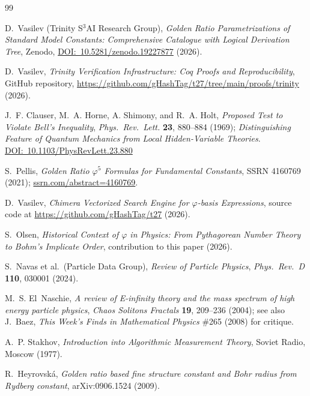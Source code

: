 \documentclass[10pt,a4paper]{article}
\begin{document}
\begin{thebibliography}{99}

D.~Vasilev (Trinity S$^3$AI Research Group),
\textit{Golden Ratio Parametrizations of Standard Model Constants: Comprehensive Catalogue
with Logical Derivation Tree}, Zenodo,
\href{https://doi.org/10.5281/zenodo.19227877}{DOI:~10.5281/zenodo.19227877} (2026).

D.~Vasilev,
\textit{Trinity Verification Infrastructure: Coq Proofs and Reproducibility},
GitHub repository,
\url{https://github.com/gHashTag/t27/tree/main/proofs/trinity} (2026).

J.~F. Clauser, M.~A. Horne, A. Shimony, and R.~A. Holt,
\textit{Proposed Test to Violate Bell's Inequality},
\textit{Phys.\ Rev.\ Lett.} \textbf{23}, 880--884 (1969);
\textit{Distinguishing Feature of Quantum Mechanics from Local Hidden-Variable Theories}.
\href{https://doi.org/10.1103/PhysRevLett.23.880}{DOI:~10.1103/PhysRevLett.23.880}

S.~Pellis,
\textit{Golden Ratio $\varphi^5$ Formulas for Fundamental Constants},
SSRN 4160769 (2021);
\href{https://www.ssrn.com/abstract=4160769}{ssrn.com/abstract=4160769}.

D.~Vasilev,
\textit{Chimera Vectorized Search Engine for $\varphi$-basis Expressions},
source code at \url{https://github.com/gHashTag/t27} (2026).

S.~Olsen,
\textit{Historical Context of $\varphi$ in Physics: From Pythagorean Number Theory
to Bohm's Implicate Order}, contribution to this paper (2026).

S.~Navas et al.\ (Particle Data Group),
\textit{Review of Particle Physics},
\textit{Phys.\ Rev.\ D} \textbf{110}, 030001 (2024).

M.~S. El~Naschie,
\textit{A review of E-infinity theory and the mass spectrum of high energy particle physics},
\textit{Chaos Solitons Fractals} \textbf{19}, 209--236 (2004);
see also J.~Baez, \textit{This Week's Finds in Mathematical Physics} \#265 (2008) for critique.

A.~P. Stakhov,
\textit{Introduction into Algorithmic Measurement Theory},
Soviet Radio, Moscow (1977).

R.~Heyrovsk\'{a},
\textit{Golden ratio based fine structure constant and Bohr radius from Rydberg constant},
arXiv:0906.1524 (2009).


\end{thebibliography}
\end{document}
